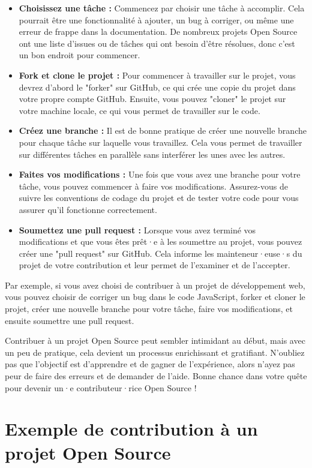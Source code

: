 \begin{itemize}
    \item \textbf{Choisissez une tâche :} Commencez par choisir une tâche à accomplir. Cela pourrait être une fonctionnalité à ajouter, un bug à corriger, ou même une erreur de frappe dans la documentation. De nombreux projets Open Source ont une liste d'issues ou de tâches qui ont besoin d'être résolues, donc c'est un bon endroit pour commencer.
    \item \textbf{Fork et clone le projet :} Pour commencer à travailler sur le projet, vous devrez d'abord le "forker" sur GitHub, ce qui crée une copie du projet dans votre propre compte GitHub. Ensuite, vous pouvez "cloner" le projet sur votre machine locale, ce qui vous permet de travailler sur le code.
    \item \textbf{Créez une branche :} Il est de bonne pratique de créer une nouvelle branche pour chaque tâche sur laquelle vous travaillez. Cela vous permet de travailler sur différentes tâches en parallèle sans interférer les unes avec les autres.
    \item \textbf{Faites vos modifications :} Une fois que vous avez une branche pour votre tâche, vous pouvez commencer à faire vos modifications. Assurez-vous de suivre les conventions de codage du projet et de tester votre code pour vous assurer qu'il fonctionne correctement.
    \item \textbf{Soumettez une pull request :} Lorsque vous avez terminé vos modifications et que vous êtes prêt·e à les soumettre au projet, vous pouvez créer une "pull request" sur GitHub. Cela informe les mainteneur·euse·s du projet de votre contribution et leur permet de l'examiner et de l'accepter.
\end{itemize}

Par exemple, si vous avez choisi de contribuer à un projet de développement web, vous pouvez choisir de corriger un bug dans le code JavaScript, forker et cloner le projet, créer une nouvelle branche pour votre tâche, faire vos modifications, et ensuite soumettre une pull request.

Contribuer à un projet Open Source peut sembler intimidant au début, mais avec un peu de pratique, cela devient un processus enrichissant et gratifiant. N'oubliez pas que l'objectif est d'apprendre et de gagner de l'expérience, alors n'ayez pas peur de faire des erreurs et de demander de l'aide. Bonne chance dans votre quête pour devenir un·e contributeur·rice Open Source !

\section{Exemple de contribution à un projet Open Source}

